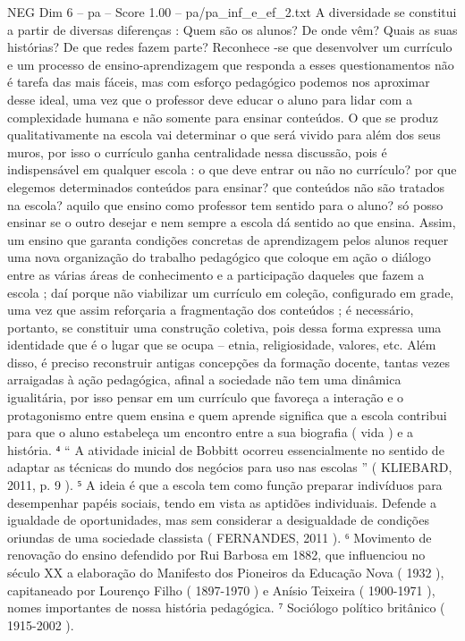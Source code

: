 \begin{textsample}{NEG Dim 6 – pa – Score 1.00 – pa/pa\_inf\_e\_ef\_2.txt}
A diversidade se constitui a partir de diversas diferenças : Quem são os alunos?
De onde vêm?
Quais as suas histórias?
De que redes fazem parte?
Reconhece -se que desenvolver um currículo e um processo de ensino-aprendizagem que responda a esses questionamentos não é tarefa das mais fáceis, mas com esforço pedagógico podemos nos aproximar desse ideal, uma vez que o professor deve educar o aluno para lidar com a complexidade humana e não somente para ensinar conteúdos.
O que se produz qualitativamente na escola vai determinar o que será vivido para além dos seus muros, por isso o currículo ganha centralidade nessa discussão, pois é indispensável em qualquer escola : o que deve entrar ou não no currículo? por que elegemos determinados conteúdos para ensinar? que conteúdos não são tratados na escola? aquilo que ensino como professor tem sentido para o aluno? só posso ensinar se o outro desejar e nem sempre a escola dá sentido ao que ensina.
Assim, um ensino que garanta condições concretas de aprendizagem pelos alunos requer uma nova organização do trabalho pedagógico que coloque em ação o diálogo entre as várias áreas de conhecimento e a participação daqueles que fazem a escola ; daí porque não viabilizar um currículo em coleção, configurado em grade, uma vez que assim reforçaria a fragmentação dos conteúdos ; é necessário, portanto, se constituir uma construção coletiva, pois dessa forma expressa uma identidade que é o lugar que se ocupa – etnia, religiosidade, valores, etc.
Além disso, é preciso reconstruir antigas concepções da formação docente, tantas vezes arraigadas à ação pedagógica, afinal a sociedade não tem uma dinâmica igualitária, por isso pensar em um currículo que favoreça a interação e o protagonismo entre quem ensina e quem aprende significa que a escola contribui para que o aluno estabeleça um encontro entre a sua biografia ( vida ) e a história. ⁴ “ A atividade inicial de Bobbitt ocorreu essencialmente no sentido de adaptar as técnicas do mundo dos negócios para uso nas escolas ” ( KLIEBARD, 2011, p. 9 ). ⁵ A ideia é que a escola tem como função preparar indivíduos para desempenhar papéis sociais, tendo em vista as aptidões individuais.
Defende a igualdade de oportunidades, mas sem considerar a desigualdade de condições oriundas de uma sociedade classista ( FERNANDES, 2011 ). ⁶ Movimento de renovação do ensino defendido por Rui Barbosa em 1882, que influenciou no século XX a elaboração do Manifesto dos Pioneiros da Educação Nova ( 1932 ), capitaneado por Lourenço Filho ( 1897-1970 ) e Anísio Teixeira ( 1900-1971 ), nomes importantes de nossa história pedagógica. ⁷ Sociólogo político britânico ( 1915-2002 ).

\end{textsample}

